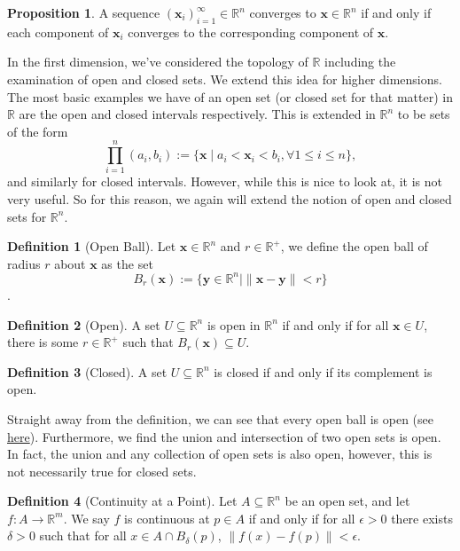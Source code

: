 \documentclass[
]{article}
\theoremstyle{definition}
\newtheorem{prop}{Proposition}
\theoremstyle{definition}
\newtheorem{definition}{Definition}[section]
\begin{document}
\begin{prop}
  A sequence \((\mathbf{x}_i)_{i = 1}^\infty \in \mathbb{R}^n\) converges to 
  \(\mathbf{x} \in \mathbb{R}^n\) if and only if each component of 
  \(\mathbf{x}_i\) converges to the corresponding component of \(\mathbf{x}\).
\end{prop}

In the first dimension, we've considered the topology of \(\mathbb{R}\)
including the examination of open and closed sets. We extend this idea
for higher dimensions. The most basic examples we have of an open set
(or closed set for that matter) in \(\mathbb{R}\) are the open and
closed intervals respectively. This is extended in \(\mathbb{R}^n\) to
be sets of the form \[
  \prod_{i = 1}^n (a_i, b_i) := \{\mathbf{x} \mid a_i < \mathbf{x}_i < b_i, 
  \forall 1 \le i \le n\},
\] and similarly for closed intervals. However, while this is nice to
look at, it is not very useful. So for this reason, we again will extend
the notion of open and closed sets for \(\mathbb{R}^n\).

\begin{definition} [Open Ball]
  Let \(\mathbf{x} \in \mathbb{R}^n\) and \(r \in \mathbb{R}^+\), we define the 
  open ball of radius \(r\) about \(\mathbf{x}\) as the set 
  \[B_r(\mathbf{x}) := \{\mathbf{y} \in \mathbb{R}^n \mid 
  \| \mathbf{x} - \mathbf{y}\| < r\}\].
\end{definition}
\begin{definition} [Open]
  A set \(U \subseteq \mathbb{  R}^n\) is open in \(\mathbb{R}^n\) if and only if 
  for all \(\mathbf{x} \in U\), there is some \(r \in \mathbb{R}^+\) such that 
  \(B_r(\mathbf{x}) \subseteq U\).
\end{definition}
\begin{definition}[Closed]
  A set \(U \subseteq \mathbb{R}^n\) is closed if and only if its complement is 
  open.
\end{definition}

Straight away from the definition, we can see that every open ball is
open (see
\href{https://github.com/JasonKYi/learn_mspaces/blob/master/src/metric_spaces/basic.lean\#L215}{here}).
Furthermore, we find the union and intersection of two open sets is
open. In fact, the union and any collection of open sets is also open,
however, this is not necessarily true for closed sets.

\begin{definition} [Continuity at a Point]
  Let \(A \subseteq \mathbb{R}^n\) be an open set, and let 
  \(f : A \to \mathbb{R}^m\). We say \(f\) is continuous at \(p \in A\) if and 
  only if for all \(\epsilon > 0\) there exists \(\delta > 0\) such that for all 
  \(x \in A \cap B_\delta(p)\), \(\| f(x) - f(p) \| < \epsilon\).
\end{definition}
\end{document}
